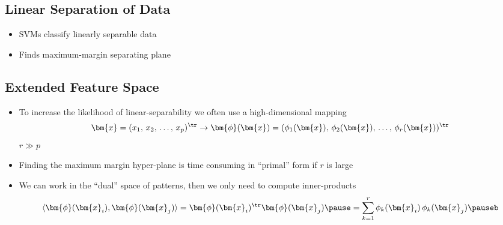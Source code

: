 
\begin{slide}
\section[-2]{Linear Separation of Data}

\pb
\begin{itemize}
\item SVMs classify linearly separable data\pause{}
  \begin{center}
    \pause
  \end{center}
\item Finds maximum-margin separating plane\pauseb
\end{itemize}

\end{slide}


\begin{slide}
\section[-2]{Extended Feature Space}

\begin{PauseHighLight}
  \begin{itemize}
  \item To increase the likelihood of linear-separability we often use a
    high-dimensional mapping
    \begin{align*}
      \bm{x}=(x_1,\,x_2,\,\ldots,\,x_p)^\tr \rightarrow \bm{\phi}(\bm{x}) =
      (\phi_1(\bm{x}),\,\phi_2(\bm{x}),\,\ldots,\,
      \phi_r(\bm{x}))^\tr
    \end{align*}
    $r\gg p$\pause
  \item Finding the maximum margin hyper-plane is time consuming in
    ``primal'' form if $r$ is large\pause
  \item We can work in the ``dual'' space of patterns, then we only need to
    compute inner-products
    \begin{align*}
      \langle \bm{\phi}(\bm{x}_i), \bm{\phi}(\bm{x}_j) \rangle =
      \bm{\phi}(\bm{x}_i)^\tr \bm{\phi}(\bm{x}_j)  \pause
      =  \sum_{k=1}^r \phi_k(\bm{x}_i) \, \phi_k(\bm{x}_j)\pauseb
    \end{align*}
  \end{itemize}
\end{PauseHighLight}

\end{slide}

